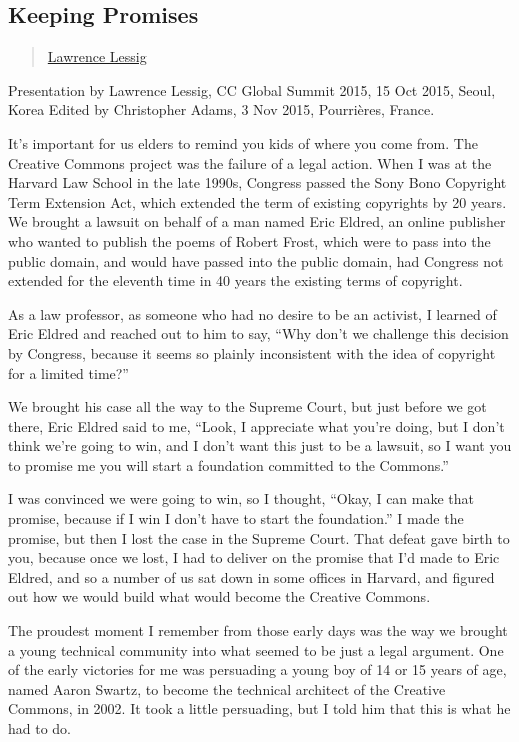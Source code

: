 \subsection{Keeping Promises}\label{keeping-promises}

\begin{quote}
\hyperlink{lawrence-lessig}{Lawrence Lessig}
\end{quote}

Presentation by Lawrence Lessig, CC Global Summit 2015, 15 Oct 2015,
Seoul, Korea Edited by Christopher Adams, 3 Nov 2015, Pourrières,
France.

It's important for us elders to remind you kids of where you come from.
The Creative Commons project was the failure of a legal action. When I
was at the Harvard Law School in the late 1990s, Congress passed the
Sony Bono Copyright Term Extension Act, which extended the term of
existing copyrights by 20 years. We brought a lawsuit on behalf of a man
named Eric Eldred, an online publisher who wanted to publish the poems
of Robert Frost, which were to pass into the public domain, and would
have passed into the public domain, had Congress not extended for the
eleventh time in 40 years the existing terms of copyright.

As a law professor, as someone who had no desire to be an activist, I
learned of Eric Eldred and reached out to him to say, ``Why don't we
challenge this decision by Congress, because it seems so plainly
inconsistent with the idea of copyright for a limited time?''

We brought his case all the way to the Supreme Court, but just before we
got there, Eric Eldred said to me, ``Look, I appreciate what you're
doing, but I don't think we're going to win, and I don't want this just
to be a lawsuit, so I want you to promise me you will start a foundation
committed to the Commons.''

I was convinced we were going to win, so I thought, ``Okay, I can make
that promise, because if I win I don't have to start the foundation.'' I
made the promise, but then I lost the case in the Supreme Court. That
defeat gave birth to you, because once we lost, I had to deliver on the
promise that I'd made to Eric Eldred, and so a number of us sat down in
some offices in Harvard, and figured out how we would build what would
become the Creative Commons.

The proudest moment I remember from those early days was the way we
brought a young technical community into what seemed to be just a legal
argument. One of the early victories for me was persuading a young boy
of 14 or 15 years of age, named Aaron Swartz, to become the technical
architect of the Creative Commons, in 2002. It took a little persuading,
but I told him that this is what he had to do.

